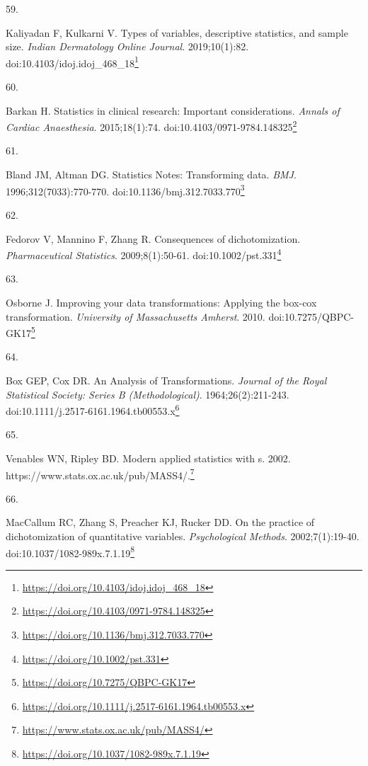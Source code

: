 \documentclass[
  a4paper,
]{book}
\newlength{\cslhangindent}
\newlength{\csllabelwidth}
\newlength{\cslentryspacingunit} %
\newenvironment{CSLReferences}[2] %
 {%
  \setlength{\parindent}{0pt}
  \ifodd #1
  \let\oldpar\par
  \def\par{\hangindent=\cslhangindent\oldpar}
  \fi
  \setlength{\parskip}{#2\cslentryspacingunit}
 }%
 {}
\newcommand{\CSLLeftMargin}[1]{\parbox[t]{\csllabelwidth}{#1}}
\newcommand{\CSLRightInline}[1]{\parbox[t]{\linewidth - \csllabelwidth}{#1}\break}
\renewcommand{\href}[2]{#2\footnote{\url{#1}}}
\begin{document}
\begin{CSLReferences}{0}{0}
\leavevmode{}%
\CSLLeftMargin{59. }%
\CSLRightInline{Kaliyadan F, Kulkarni V. Types of variables, descriptive statistics, and sample size. \emph{Indian Dermatology Online Journal}. 2019;10(1):82. doi:\href{https://doi.org/10.4103/idoj.idoj_468_18}{10.4103/idoj.idoj\_468\_18}}

\leavevmode{}%
\CSLLeftMargin{60. }%
\CSLRightInline{Barkan H. Statistics in clinical research: Important considerations. \emph{Annals of Cardiac Anaesthesia}. 2015;18(1):74. doi:\href{https://doi.org/10.4103/0971-9784.148325}{10.4103/0971-9784.148325}}

\leavevmode{}%
\CSLLeftMargin{61. }%
\CSLRightInline{Bland JM, Altman DG. Statistics Notes: Transforming data. \emph{BMJ}. 1996;312(7033):770-770. doi:\href{https://doi.org/10.1136/bmj.312.7033.770}{10.1136/bmj.312.7033.770}}

\leavevmode{}%
\CSLLeftMargin{62. }%
\CSLRightInline{Fedorov V, Mannino F, Zhang R. Consequences of dichotomization. \emph{Pharmaceutical Statistics}. 2009;8(1):50-61. doi:\href{https://doi.org/10.1002/pst.331}{10.1002/pst.331}}

\leavevmode{}%
\CSLLeftMargin{63. }%
\CSLRightInline{Osborne J. Improving your data transformations: Applying the box-cox transformation. \emph{University of Massachusetts Amherst}. 2010. doi:\href{https://doi.org/10.7275/QBPC-GK17}{10.7275/QBPC-GK17}}

\leavevmode{}%
\CSLLeftMargin{64. }%
\CSLRightInline{Box GEP, Cox DR. An Analysis of Transformations. \emph{Journal of the Royal Statistical Society: Series B (Methodological)}. 1964;26(2):211-243. doi:\href{https://doi.org/10.1111/j.2517-6161.1964.tb00553.x}{10.1111/j.2517-6161.1964.tb00553.x}}

\leavevmode{}%
\CSLLeftMargin{65. }%
\CSLRightInline{Venables WN, Ripley BD. Modern applied statistics with s. 2002. \href{https://www.stats.ox.ac.uk/pub/MASS4/}{https://www.stats.ox.ac.uk/pub/MASS4/.}}

\leavevmode{}%
\CSLLeftMargin{66. }%
\CSLRightInline{MacCallum RC, Zhang S, Preacher KJ, Rucker DD. On the practice of dichotomization of quantitative variables. \emph{Psychological Methods}. 2002;7(1):19-40. doi:\href{https://doi.org/10.1037/1082-989x.7.1.19}{10.1037/1082-989x.7.1.19}}


\end{CSLReferences}
\end{document}
